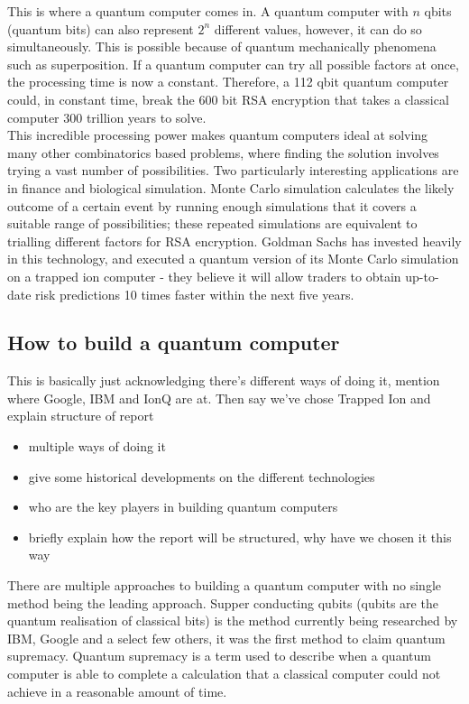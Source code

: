 This is where a quantum computer comes in. A quantum computer with $n$ qbits (quantum bits) can also represent $2^n$ different values, however, it can do so simultaneously. This is possible because of quantum mechanically phenomena such as superposition. If a quantum computer can try all possible factors at once, the processing time is now a constant. Therefore, a 112 qbit quantum computer could, in constant time, break the 600 bit RSA encryption that takes a classical computer 300 trillion years to solve.\\

This incredible processing power makes quantum computers ideal at solving many other combinatorics based problems, where finding the solution involves trying a vast number of possibilities. Two particularly interesting applications are in finance and biological simulation. Monte Carlo simulation calculates the likely outcome of a certain event by running enough simulations that it covers a suitable range of possibilities; these repeated simulations are equivalent to trialling different factors for RSA encryption. Goldman Sachs has invested heavily in this technology, and executed a quantum version of its Monte Carlo simulation on a trapped ion computer - they believe it will allow traders to obtain up-to-date risk predictions 10 times faster within the next five years.

\subsection{How to build a quantum computer}
This is basically just acknowledging there's different ways of doing it, mention where Google, IBM and IonQ are at. Then say we've chose Trapped Ion and explain structure of report 
\begin{itemize}
    \item multiple ways of doing it
    \item give some historical developments on the different technologies
    \item who are the key players in building quantum computers
    \item briefly explain how the report will be structured, why have we chosen it this way
\end{itemize}

There are multiple approaches to building a quantum computer with no single method being the leading approach.
Supper conducting qubits (qubits are the quantum realisation of classical bits) is the method currently being researched by IBM, Google and a select few others, it was the first method to claim quantum supremacy. \cite{gibney_hello_2019}
Quantum supremacy is a term used to describe when a quantum computer is able to complete a calculation that a classical computer could not achieve in a reasonable amount of time. 

